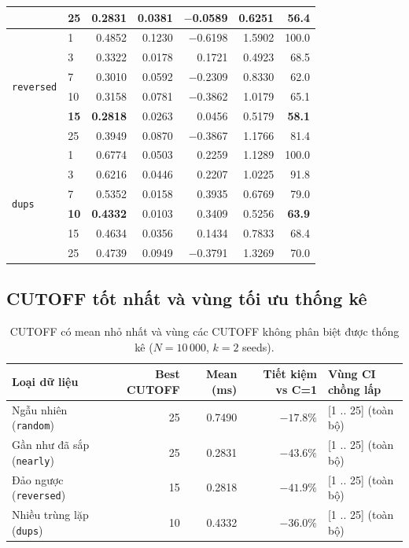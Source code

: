 \documentclass[12pt, a4paper]{article}
\begin{document}
\begin{table}[H]
\begin{tabular}{llrrrrr}
& \textbf{25} & \textbf{0.2831} & 0.0381 & $-$0.0589 & 0.6251 & \textbf{56.4} \\
\midrule
\multirow{6}{*}{\texttt{reversed}}
& 1  & 0.4852 & 0.1230 & $-$0.6198 & 1.5902 & 100.0 \\
& 3  & 0.3322 & 0.0178 & 0.1721 & 0.4923 & 68.5 \\
& 7  & 0.3010 & 0.0592 & $-$0.2309 & 0.8330 & 62.0 \\
& 10 & 0.3158 & 0.0781 & $-$0.3862 & 1.0179 & 65.1 \\
\rowcolor{bestrow}
& \textbf{15} & \textbf{0.2818} & 0.0263 & 0.0456 & 0.5179 & \textbf{58.1} \\
& 25 & 0.3949 & 0.0870 & $-$0.3867 & 1.1766 & 81.4 \\
\midrule
\multirow{6}{*}{\texttt{dups}}
& 1  & 0.6774 & 0.0503 & 0.2259 & 1.1289 & 100.0 \\
& 3  & 0.6216 & 0.0446 & 0.2207 & 1.0225 & 91.8 \\
& 7  & 0.5352 & 0.0158 & 0.3935 & 0.6769 & 79.0 \\
\rowcolor{bestrow}
& \textbf{10} & \textbf{0.4332} & 0.0103 & 0.3409 & 0.5256 & \textbf{63.9} \\
& 15 & 0.4634 & 0.0356 & 0.1434 & 0.7833 & 68.4 \\
& 25 & 0.4739 & 0.0949 & $-$0.3791 & 1.3269 & 70.0 \\
\bottomrule
\end{tabular}
\end{table}

\subsection{CUTOFF tốt nhất và vùng tối ưu thống kê}

\begin{table}[H]
\centering
\caption{CUTOFF có mean nhỏ nhất và vùng các CUTOFF không phân biệt được thống kê
         ($N = 10\,000$, $k = 2$ seeds).}
\label{tab:best}
\renewcommand{\arraystretch}{1.3}
\begin{tabular}{lrrrp{4.5cm}}
\toprule
\textbf{Loại dữ liệu} & \textbf{Best CUTOFF} & \textbf{Mean (ms)}
                      & \textbf{Tiết kiệm vs C=1} & \textbf{Vùng CI chồng lấp} \\
\midrule
\rowcolor{rowodd}  Ngẫu nhiên (\texttt{random})            & 25 & 0.7490 & $-17.8\%$ & {[1 .. 25] (toàn bộ)} \\
\rowcolor{roweven} Gần như đã sắp (\texttt{nearly})        & 25 & 0.2831 & $-43.6\%$ & {[1 .. 25] (toàn bộ)} \\
\rowcolor{rowodd}  Đảo ngược (\texttt{reversed})           & 15 & 0.2818 & $-41.9\%$ & {[1 .. 25] (toàn bộ)} \\
\rowcolor{roweven} Nhiều trùng lặp (\texttt{dups})         & 10 & 0.4332 & $-36.0\%$ & {[1 .. 25] (toàn bộ)} \\
\bottomrule
\end{tabular}
\end{table}
\end{document}
